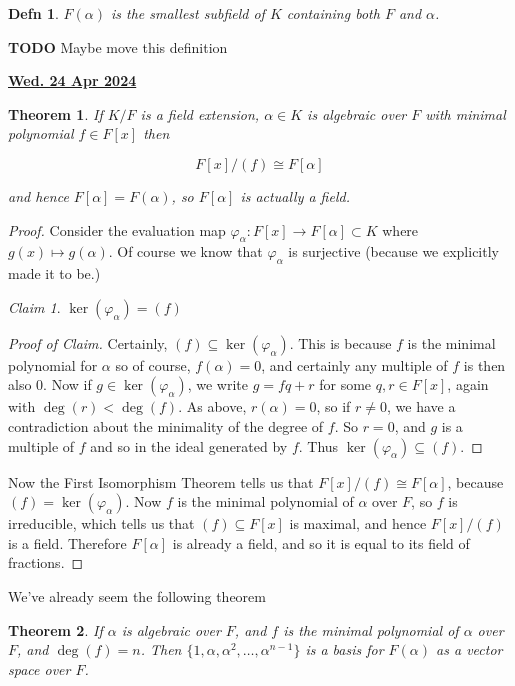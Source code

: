 \documentclass[12pt]{article}
\renewcommand{\date}[1]{\underline{\bf #1}}
\def\TODO{\color{red}\textbf{TODO}\color{black}}
\newtheorem{theorem}{Theorem}
\newtheorem{definition}{Defn}
\theoremstyle{remark}
\theoremstyle{remark}
\newtheorem{claim}{Claim}
\theoremstyle{remark}
\theoremstyle{remark}
\theoremstyle{remark}
\begin{document}
\begin{definition}
  $F(\alpha)$ is the smallest subfield of $K$ containing both $F$ and $\alpha$.
\end{definition}

\TODO{} Maybe move this definition

\date{Wed. 24 Apr 2024}

\begin{theorem}
  If $K / F$ is a field extension, $\alpha \in K$ is algebraic over $F$ with
  minimal polynomial $f \in F[x]$ then

  \[
    F[x] / (f) \cong F[\alpha]
  \]

  and hence $F[\alpha] = F(\alpha)$, so $F[\alpha]$ is actually a field.
\end{theorem}

\begin{proof}
  Consider the evaluation map $\varphi_{\alpha}: F[x] \to F[\alpha] \subset K$
  where $g(x) \mapsto g(\alpha)$. Of course we know that $\varphi_{\alpha}$ is
  surjective (because we explicitly made it to be.)

  \begin{claim}
    $\ker(\varphi_{\alpha}) = (f)$
  \end{claim}
  \begin{proof}[Proof of Claim]
    Certainly, $(f) \subseteq \ker(\varphi_{\alpha})$. This is because $f$ is
    the minimal polynomial for $\alpha$ so of course, $f(\alpha) = 0$, and
    certainly any multiple of $f$ is then also $0$. Now if $g \in
    \ker(\varphi_{\alpha})$, we write $g = fq + r$ for some $q, r \in F[x]$,
    again with $\deg(r) < \deg(f)$. As above, $r(\alpha) = 0$, so if $r \ne 0$,
    we have a contradiction about the minimality of the degree of $f$. So $r =
    0$, and $g$ is a multiple of $f$ and so in the ideal generated by $f$. Thus
    $\ker(\varphi_{\alpha}) \subseteq (f)$.
  \end{proof}

  Now the First Isomorphism Theorem tells us that $F[x] / (f) \cong F[\alpha]$,
  because $(f) = \ker(\varphi_{\alpha})$. Now $f$ is the minimal polynomial of
  $\alpha$ over $F$, so $f$ is irreducible, which tells us that $(f) \subseteq
  F[x]$ is maximal, and hence $F[x] / (f)$ is a field. Therefore $F[\alpha]$ is
  already a field, and so it is equal to its field of fractions.
\end{proof}

We've already seem the following theorem

\begin{theorem}
  If $\alpha$ is algebraic over $F$, and $f$ is the minimal polynomial of
  $\alpha$ over $F$, and $\deg (f) = n$. Then $\{1, \alpha, \alpha^2, \dots,
  \alpha^{n - 1}\}$ is a basis for $F(\alpha)$ as a vector space over $F$.
\end{theorem}
\end{document}

